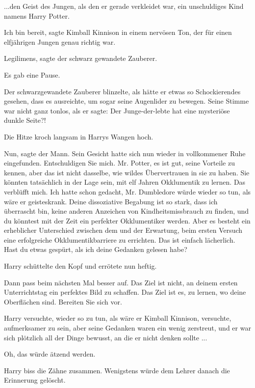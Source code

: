 ...den Geist des Jungen, als den er gerade verkleidet war, ein unschuldiges Kind
namens Harry Potter.

\glqq{}Ich bin bereit\grqq{}, sagte Kimball Kinnison in einem nervösen Ton, der
für einen elfjährigen Jungen genau richtig war.

\glqq{}Legilimens\grqq{}, sagte der schwarz gewandete Zauberer.

Es gab eine Pause.

Der schwarzgewandete Zauberer blinzelte, als hätte er etwas so Schockierendes
gesehen, dass es ausreichte, um sogar seine Augenlider zu bewegen. Seine Stimme
war nicht ganz tonlos, als er sagte: \glqq{}Der Junge-der-lebte hat eine
mysteriöse dunkle Seite?!\grqq{}

Die Hitze kroch langsam in Harrys Wangen hoch.

\glqq{}Nun\grqq{}, sagte der Mann. Sein Gesicht hatte sich nun wieder in
vollkommener Ruhe eingefunden. \glqq{}Entschuldigen Sie mich. Mr. Potter, es ist
gut, seine Vorteile zu kennen, aber das ist nicht dasselbe, wie wildes
Übervertrauen in sie zu haben. Sie könnten tatsächlich in der Lage sein, mit elf
Jahren Okklumentik zu lernen. Das verblüfft mich. Ich hatte schon gedacht, Mr.
Dumbledore würde wieder so tun, als wäre er geisteskrank. Deine dissoziative
Begabung ist so stark, dass ich überrascht bin, keine anderen Anzeichen von
Kindheitsmissbrauch zu finden, und du könntest mit der Zeit ein perfekter
Okklumentiker werden. Aber es besteht ein erheblicher Unterschied zwischen dem
und der Erwartung, beim ersten Versuch eine erfolgreiche Okklumentikbarriere zu
errichten. Das ist einfach lächerlich. Hast du etwas gespürt, als ich deine
Gedanken gelesen habe?\grqq{}

Harry schüttelte den Kopf und errötete nun heftig.

\glqq{}Dann pass beim nächsten Mal besser auf. Das Ziel ist nicht, an deinem
ersten Unterrichtstag ein perfektes Bild zu schaffen. Das Ziel ist es, zu
lernen, wo deine Oberflächen sind. Bereiten Sie sich vor.\grqq{}

Harry versuchte, wieder so zu tun, als wäre er Kimball Kinnison, versuchte,
aufmerksamer zu sein, aber seine Gedanken waren ein wenig zerstreut, und er war
sich plötzlich all der Dinge bewusst, an die er nicht denken sollte ...

Oh, das würde ätzend werden.

Harry biss die Zähne zusammen. Wenigstens würde dem Lehrer danach die Erinnerung
gelöscht.


